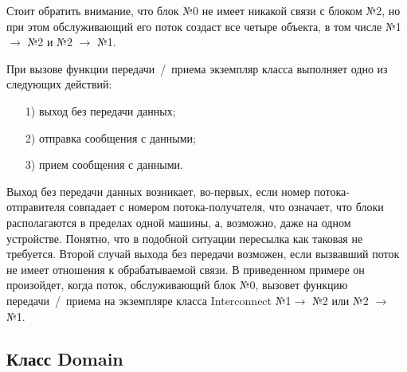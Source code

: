 \documentclass[a4paper, 14pt]{extarticle}
\theoremstyle{definition}
\begin{document}
\par Стоит обратить внимание, что блок №0 не имеет никакой связи с блоком №2, но при этом обслуживающий его поток создаст все четыре объекта, в том числе {№1 $\to$ №2} и {№2 $\to$ №1}. 

\par При вызове функции передачи~/~приема экземпляр класса выполняет одно из следующих действий:
\begin{enumerate}
\item[1)] выход без передачи данных;
\item[2)] отправка сообщения с данными;
\item[3)] прием сообщения с данными.
\end{enumerate}

\par Выход без передачи данных возникает, во-первых, если номер потока-отправителя совпадает с номером потока-получателя, что означает, что блоки располагаются в пределах одной машины, а, возможно, даже на одном устройстве. Понятно, что в подобной ситуации пересылка как таковая не требуется. Второй случай выхода без передачи возможен, если вызвавший поток не имеет отношения к обрабатываемой связи. В приведенном примере он произойдет, когда поток, обслуживающий блок №0, вызовет функцию передачи~/~приема на экземпляре класса Interconnect {№1$\to$ №2} или {№2 $\to$ №1}.



\subsection{Класс Domain}
\end{document}
